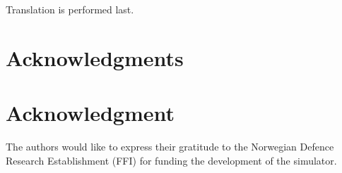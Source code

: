 

Translation is performed last. 


\ifCLASSOPTIONcompsoc%
% 
% 
% 
% 
% 
  \section*{Acknowledgments}
\else
  \section*{Acknowledgment}
\fi


The authors would like to express their gratitude to the Norwegian Defence Research Establishment (FFI) for funding the development of the simulator.

\ifCLASSOPTIONcaptionsoff
  \newpage
\fi

\ifPhdDoc
%    
\else
   \ifBuildBibliography
      
      

   \else
   \fi

  
   
   
   
   
   
   
